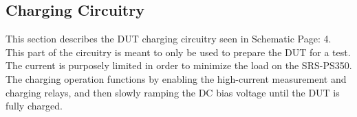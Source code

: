 \subsection{Charging Circuitry}
\label{sec:charging}

This section describes the DUT charging circuitry seen in Schematic Page: 4. This part of the circuitry is meant to only be used to prepare the DUT for a test. The current is purposely limited in order to minimize the load on the SRS-PS350. The charging operation functions by enabling the high-current measurement and charging relays, and then slowly ramping the DC bias voltage until the DUT is fully charged.

